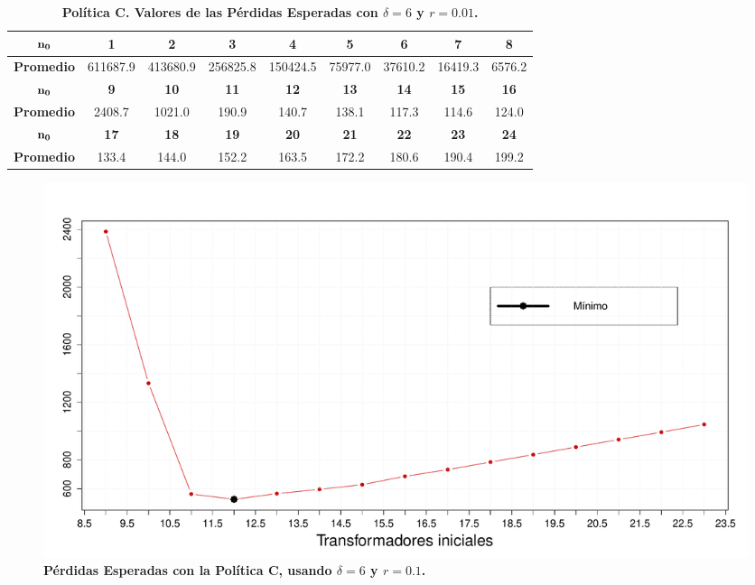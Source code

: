 \begin{table}[h!]\small
\centering
\caption{\bf Pol\'itica C. Valores de las P\'erdidas Esperadas con $\delta=6$ y $r=0.01$.}\label{u38t}
\begin{tabular}{ccccccccc}
\toprule[0.6mm]
$\bf{n_0}$&\bf{1} &                   \bf{2} &                   \bf{3} &                   \bf{ 4 }&                    \bf{ 5}&              \bf{ 6} &               \bf{ 7} & \bf{8} \\
\hline
{\bf Promedio}& 611687.9 &413680.9 &256825.8& 150424.5&  75977.0  &37610.2 & 16419.3 &   6576.2  \\
\hline
$\bf{n_0}$&\bf{9} &                \bf{ 10}&              \bf{      11} &                   \bf{ 12} &               \bf{      13}&              \bf{14} &  \bf{ 15} & \bf{16 }   \\
\hline
{\bf Promedio}&	    2408.7  & 1021.0 &   190.9 &   140.7 & 138.1  &  117.3  &  114.6 &   124.0  \\
	 \hline
	
$\bf{n_0}$&\bf{17} &     \bf{ 18}&   \bf{19}&   \bf{ 20} &           \bf{   21}&                \bf{  22}  & \bf{23} &  \bf{24}\\
\hline
{\bf Promedio}&  133.4 &   144.0 &152.2    &163.5 &   172.2  &  180.6 &   190.4 &199.2\\
\toprule[0.6mm]
\end{tabular}

\end{table}
\begin{figure}[h!]
\begin{center}
\includegraphics[scale=0.3]{uA6puntouno.pdf}
\end{center}
\vspace{-1 cm} \caption{\bf P\'erdidas Esperadas con la Pol\'itica C, usando $\delta=6$ y $r=0.1$.}\label{u36i}
\end{figure}


